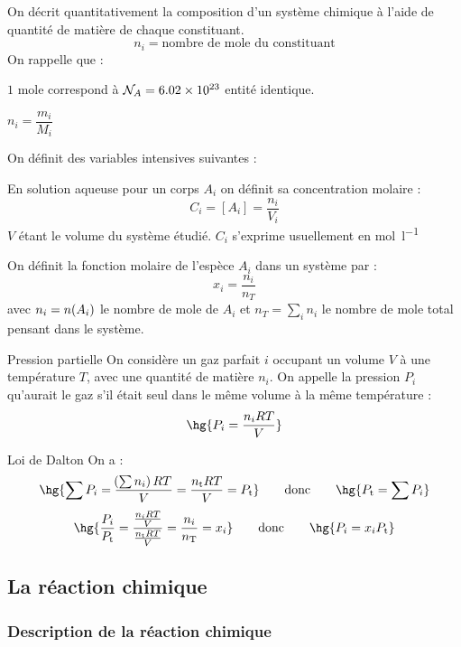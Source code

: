 \documentclass[a4paper,french,bookmarks]{book}
\begin{document}
    On décrit quantitativement la composition d'un système chimique à l'aide de quantité de matière de chaque constituant.
    \[ n_i = \text{nombre de mole du constituant} \]
    On rappelle que :
    \begin{enumerate}
        \itt $1$ mole correspond à $\mathcal{N}_A = \qty{6.02e23}{}$ entité identique.
        
        \itt $n_i = \dfrac{m_i}{M_i}$
    \end{enumerate}
    On définit des variables intensives suivantes :
    \begin{enumerate}
        \itt En solution aqueuse pour un corps $A_i$ on définit sa concentration molaire :
        \[ C_i = [A_i] = \frac{n_i}{V_i}\]
        $V$ étant le volume du système étudié. $C_i$ s'exprime usuellement en \unit{\mol\per\litre}
        
        \itt On définit la fonction molaire de l'espèce $A_i$ dans un système par :
        \[ x_i = \frac{n_i}{n_T} \]
        avec $n_i = n\!\left(A_i\right)$ le nombre de mole de $A_i$ et $n_T = \displaystyle\sum_i n_i$ le nombre de mole total pensant dans le système.
    \end{enumerate}

    \begin{definition}{Pression partielle}{}
        On considère un gaz parfait $i$ occupant un volume $V$ à une température $T$, avec une quantité de matière $n_i$. On appelle  la pression $P_i$ qu'aurait le gaz s'il était seul dans le même volume à la même température :
        \[ \hg{P_i = \dfrac{n_iRT}{V}}\]
    \end{definition}
    \begin{property}{Loi de Dalton}{}
        On a :
        \[ \hg{\sum P_i = \dfrac{\p{\sum n_i}RT}{V} = \dfrac{n_\text tRT}{V} = P_\text t} \qquad\text{donc}\qquad \hg{P_\text t = \sum P_i}\]
        \[ \hg{\dfrac{P_i}{P_\text t} = \dfrac{\frac{n_iRT}{V}}{\frac{n_\text t RT}{V}} = \dfrac{n_i}{n_\text T} = x_i} \qquad\text{donc}\qquad \hg{P_i = x_iP_\text t}\]
    \end{property}
    
    \subsection{La réaction chimique}
    \subsubsection{Description de la réaction chimique}
    
\end{document}
